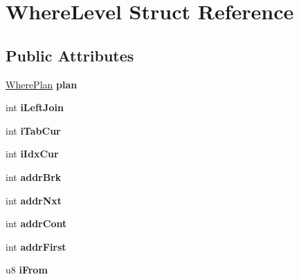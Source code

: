 \hypertarget{struct_where_level}{\section{Where\-Level Struct Reference}
\label{struct_where_level}
}
\subsection*{Public Attributes}
\begin{DoxyCompactItemize}
\item 
\hypertarget{struct_where_level_a4567b2ab4792fea7a1bc4e9baa494394}{\hyperlink{struct_where_plan}{Where\-Plan} {\bfseries plan}}\label{struct_where_level_a4567b2ab4792fea7a1bc4e9baa494394}

\item 
\hypertarget{struct_where_level_a600072864f71c568cabcbb6140f6955a}{int {\bfseries i\-Left\-Join}}\label{struct_where_level_a600072864f71c568cabcbb6140f6955a}

\item 
\hypertarget{struct_where_level_aa31c27c3304de936a6ce974450c55592}{int {\bfseries i\-Tab\-Cur}}\label{struct_where_level_aa31c27c3304de936a6ce974450c55592}

\item 
\hypertarget{struct_where_level_a0733f34c7987c721351ab0001d4b1dd9}{int {\bfseries i\-Idx\-Cur}}\label{struct_where_level_a0733f34c7987c721351ab0001d4b1dd9}

\item 
\hypertarget{struct_where_level_a06f788bd4109f394d162250af9582e45}{int {\bfseries addr\-Brk}}\label{struct_where_level_a06f788bd4109f394d162250af9582e45}

\item 
\hypertarget{struct_where_level_ab4b748f1fa2ec727f00ca42d9df60144}{int {\bfseries addr\-Nxt}}\label{struct_where_level_ab4b748f1fa2ec727f00ca42d9df60144}

\item 
\hypertarget{struct_where_level_a493d44d8f3b53d4d47191d751f8a9a94}{int {\bfseries addr\-Cont}}\label{struct_where_level_a493d44d8f3b53d4d47191d751f8a9a94}

\item 
\hypertarget{struct_where_level_a2d87c8fb787ca4111d7ab38a838325a8}{int {\bfseries addr\-First}}\label{struct_where_level_a2d87c8fb787ca4111d7ab38a838325a8}

\item 
\hypertarget{struct_where_level_a4d8e905640b12a5075ff5e2f395876dd}{u8 {\bfseries i\-From}}\label{struct_where_level_a4d8e905640b12a5075ff5e2f395876dd}


\end{DoxyCompactItemize}
